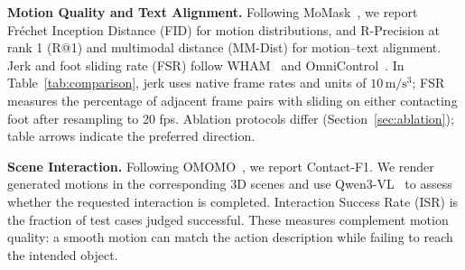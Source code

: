 \noindent\textbf{Motion Quality and Text Alignment.} Following MoMask~\citep{guo2024momask}, we report Fr\'echet Inception Distance (FID) for motion distributions, and R-Precision at rank 1 (R@1) and multimodal distance (MM-Dist) for motion--text alignment. Jerk and foot sliding rate (FSR) follow WHAM~\citep{shin2024wham} and OmniControl~\citep{xie2024omnicontrol}. In Table~\ref{tab:comparison}, jerk uses native frame rates and units of $10\,\mathrm{m/s^3}$; FSR measures the percentage of adjacent frame pairs with sliding on either contacting foot after resampling to 20 fps. Ablation protocols differ (Section~\ref{sec:ablation}); table arrows indicate the preferred direction.

\noindent\textbf{Scene Interaction.} Following OMOMO~\citep{li2023omomo}, we report Contact-F1. We render generated motions in the corresponding 3D scenes and use Qwen3-VL~\citep{bai2025qwen3} to assess whether the requested interaction is completed. Interaction Success Rate (ISR) is the fraction of test cases judged successful. These measures complement motion quality: a smooth motion can match the action description while failing to reach the intended object.

